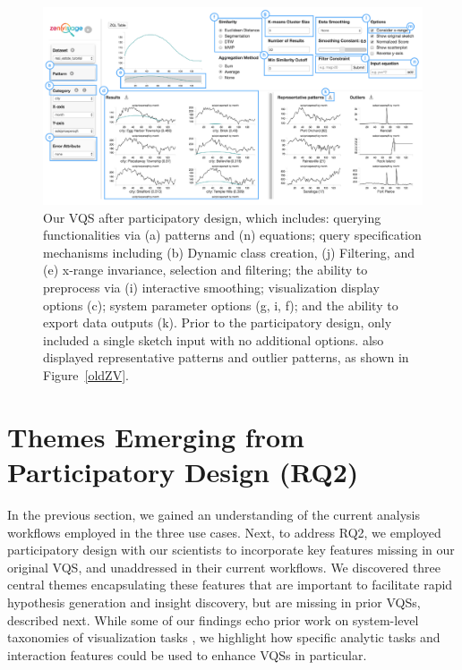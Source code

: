 \begin{figure}[ht!]
\centering
\vspace{-15pt}
\includegraphics[width=\linewidth]{figures/newZV.pdf} %
\vspace{-5pt}\caption{Our VQS after participatory design, which includes: querying functionalities via (a) patterns and (n) equations; query specification mechanisms including  (b) Dynamic class creation, (j) Filtering, and  (e) x-range invariance, selection and filtering; the ability to preprocess via (i) interactive smoothing; visualization display options (c); system parameter options (g, i, f); and the ability to export data outputs (k). Prior to the participatory design, \zv only included a single sketch input with no additional options. \zv also displayed representative patterns and outlier patterns, as shown in Figure~\ref{oldZV}.}
\label{zvOverview}
\vspace{-14pt}
\end{figure}

\section{Themes Emerging from Participatory Design (RQ2)}\label{findings}
\par In the previous section, we gained an understanding of the current analysis workflows employed in the three use cases. Next, to address RQ2, we employed participatory design with our scientists to incorporate key features  missing in our original VQS, and unaddressed in their
current workflows. We discovered three central themes encapsulating these features that are important to facilitate rapid hypothesis generation and insight discovery, but are missing in prior VQSs,  described next. While some of our findings echo prior work on system-level taxonomies of visualization tasks \cite{Amar2005,Heer2012}, we highlight how specific analytic tasks and interaction features could be used to enhance VQSs in particular. 
